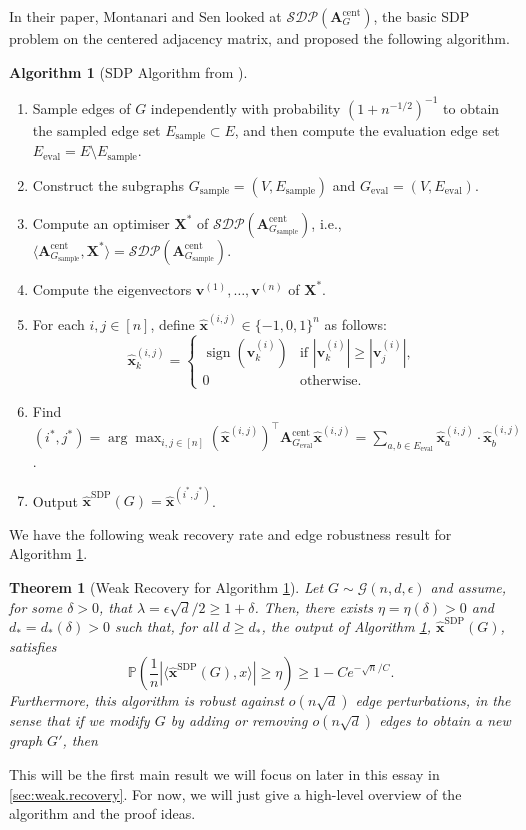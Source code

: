 \documentclass[11pt, titlepage]{article} %
\numberwithin{equation}{section}
\newtheorem{theorem}{Theorem}
\theoremstyle{definition}
\newtheorem{algorithm}{Algorithm}
\numberwithin{theorem}{section}
\numberwithin{lemma}{section}
\numberwithin{corollary}{section}
\numberwithin{proposition}{section}
\numberwithin{definition}{section}
\numberwithin{remark}{section}
\begin{document}
In their paper, Montanari and Sen looked at $\mathcal{SDP}(\bm{A}_G^{\mathrm{cent}})$, the basic
SDP problem on the centered adjacency matrix, and proposed the following algorithm.
\begin{algorithm}[SDP Algorithm from \cite{MS16}]
\label{alg:MS16}
\leavevmode
\begin{enumerate}
    \item Sample edges of $G$ independently with probability $(1 + n^{-1/2})^{-1}$ to obtain the sampled edge set $E_\mathrm{sample} \subset E$, and then compute the evaluation edge set $E_\mathrm{eval} = E \setminus E_\mathrm{sample}$.
    \item Construct the subgraphs $G_\mathrm{sample} = (V, E_\mathrm{sample})$ and $G_\mathrm{eval} = (V, E_\mathrm{eval})$.
    \item Compute an optimiser $\bm{X}^*$ of $\mathcal{SDP}(\bm{A}_{G_\mathrm{sample}}^{\mathrm{cent}})$, i.e., $\langle \bm{A}_{G_\mathrm{sample}}^{\mathrm{cent}}, \bm{X}^* \rangle = \mathcal{SDP}(\bm{A}_{G_\mathrm{sample}}^{\mathrm{cent}})$.
    \item Compute the eigenvectors $\bm{v}^{(1)}, \ldots, \bm{v}^{(n)}$ of $\bm{X}^*$.
    \item For each $i,j \in [n]$, define $\hat{\bm{x}}^{(i,j)} \in \{-1, 0, 1\}^{n}$ as follows:
    \[\hat{\bm{x}}^{(i,j)}_k = \begin{cases}
      \operatorname{sign}(\bm{v}^{(i)}_k) & \text{if } |\bm{v}^{(i)}_k| \geq |\bm{v}^{(i)}_j|, \\
      0 & \text{otherwise}.
    \end{cases}\]
    \label{alg:MS16.rounding}
    \item Find $(i^*, j^*) = \arg\max_{i,j \in [n]} (\hat{\bm{x}}^{(i,j)})^\top \bm{A}_{G_\mathrm{eval}}^{\mathrm{cent}} \hat{\bm{x}}^{(i,j)} = \sum_{a,b \in E_\mathrm{eval}}\hat{\bm{x}}^{(i,j)}_a \cdot \hat{\bm{x}}^{(i,j)}_b$.
    \label{alg:MS16.selection}
    \item Output $\hat{\bm{x}}^\mathrm{SDP}(G) = \hat{\bm{x}}^{(i^*,j^*)}$.
\end{enumerate}
\end{algorithm}
We have the following weak recovery rate and edge robustness result for Algorithm \ref{alg:MS16}.
\begin{theorem}[Weak Recovery for Algorithm \ref{alg:MS16}]\label{thm:MS16.recovery}
Let $G \sim \mathcal{G}(n, d, \epsilon)$ and assume, for some $\delta > 0$, that $\lambda = \epsilon\sqrt{d}/2 \geq 1 + \delta$.
Then, there exists $\eta = \eta(\delta) > 0$ and $d_* = d_*(\delta) > 0$ such that, for all $d \geq d_*$,
the output of Algorithm \ref{alg:MS16}, $\hat{\bm{x}}^\mathrm{SDP}(G)$, satisfies
\[\mathbb{P}\left(\frac{1}{n} |\langle \hat{\bm{x}}^\mathrm{SDP}(G), x \rangle| \geq \eta \right) \geq 1 - Ce^{-\sqrt{n}/C}.\]
Furthermore, this algorithm is robust against $o(n\sqrt{d})$ edge perturbations, in the sense that
if we modify $G$ by adding or removing $o(n\sqrt{d})$ edges to obtain a new graph $G'$, then 
\end{theorem}
This will be the first main result we will focus on later in this essay in \cref{sec:weak.recovery}. 
For now, we will just give a high-level overview of the algorithm and the proof ideas.
\end{document}
